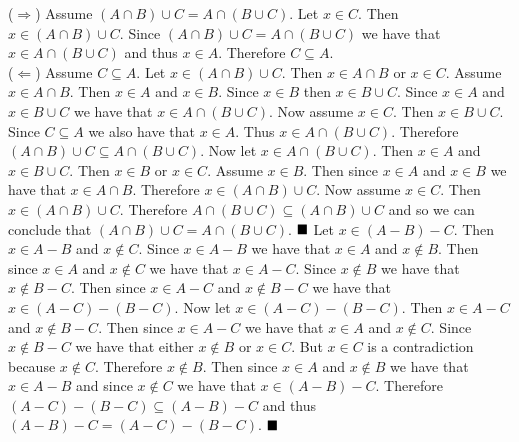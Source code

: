 \documentclass[12pt]{book}
\begin{document}
{($\Rightarrow$) Assume $(A \cap B) \cup C = A \cap (B \cup C)$. Let $x \in C$. Then $x \in (A \cap B) \cup C$. Since $(A \cap B) \cup C = A \cap (B \cup C)$ we have that $x \in A \cap (B \cup C)$ and thus $x \in A$. Therefore $C \subseteq A$.\\ ($\Leftarrow$) Assume $C \subseteq A$. Let $x \in (A \cap B) \cup C$. Then $x \in A \cap B$ or $x \in C$. Assume $x \in A \cap B$. Then $x \in A$ and $x \in B$. Since $x \in B$ then $x \in B \cup C$. Since $x \in A$ and $x \in B \cup C$ we have that $x \in A \cap (B \cup C)$. Now assume $x \in C$. Then $x \in B \cup C$. Since $C \subseteq A$ we also have that $x \in A$. Thus $x \in A \cap (B \cup C)$. Therefore $(A \cap B) \cup C \subseteq A \cap (B \cup C)$. Now let $x \in A \cap (B \cup C)$. Then $x \in A$ and $x \in B \cup C$. Then $x \in B$ or $x \in C$. Assume $x \in B$. Then since $x \in A$ and $x \in B$ we have that $x \in A \cap B$. Therefore $x \in (A \cap B) \cup C$. Now assume $x \in C$. Then $x \in (A \cap B) \cup C$. Therefore $A \cap (B \cup C) \subseteq (A \cap B) \cup C$ and so we can conclude that $(A \cap B) \cup C = A \cap (B \cup C)$. $\qed$}
{Let $x \in (A - B) - C$. Then $x \in A - B$ and $x \notin C$. Since $x \in A - B$ we have that $x \in A$ and $x \notin B$. Then since $x \in A$ and $x \notin C$ we have that $x \in A - C$. Since $x \notin B$ we have that $x \notin B - C$. Then since $x \in A - C$ and $x \notin B - C$ we have that $x \in (A - C) - (B - C)$. Now let $x \in (A - C) - (B - C)$. Then $x \in A - C$ and $x \notin B - C$. Then since $x \in A - C$ we have that $x \in A$ and $x \notin C$. Since $x \notin B - C$ we have that either $x \notin B$ or $x \in C$. But $x \in C$ is a contradiction because $x \notin C$. Therefore $x \notin B$. Then since $x \in A$ and $x \notin B$ we have that $x \in A - B$ and since $x \notin C$ we have that $x \in (A - B) - C$. Therefore $(A - C) - (B - C) \subseteq (A - B) - C$ and thus $(A - B) - C = (A - C) - (B - C)$. $\qed$}
\end{document}
